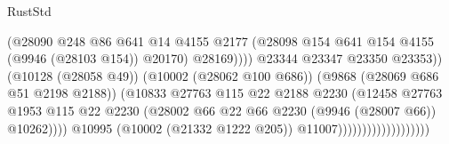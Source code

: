 \begin{lexlean}{RustStd}
\begin{coremodule}
                                                      (@28090
                                                        @248
                                                        @86
                                                        @641
                                                        @14
                                                        @4155
                                                        @2177
                                                        (@28098
                                                          @154
                                                          @641
                                                          @154
                                                          @4155
                                                          (@9946 (@28103 @154))
                                                          @20170)
                                                        @28169))))
                                                @23344
                                                @23347
                                                @23350
                                                @23353))
                                            (@10128 (@28058 @49))
                                            (@10002 (@28062 @100 @686))
                                            (@9868 (@28069 @686 @51 @2198 @2188))
                                            (@10833
                                              @27763
                                              @115
                                              @22
                                              @2188
                                              @2230
                                              (@12458
                                                @27763
                                                @1953
                                                @115
                                                @22
                                                @2230
                                                (@28002
                                                  @66
                                                  @22
                                                  @66
                                                  @2230
                                                  (@9946 (@28007 @66))
                                                  @10262))))
                                          @10995
                                          (@10002 (@21332 @1222 @205))
                                          @11007)))))))))))))))))))

\end{coremodule}
\end{lexlean}
